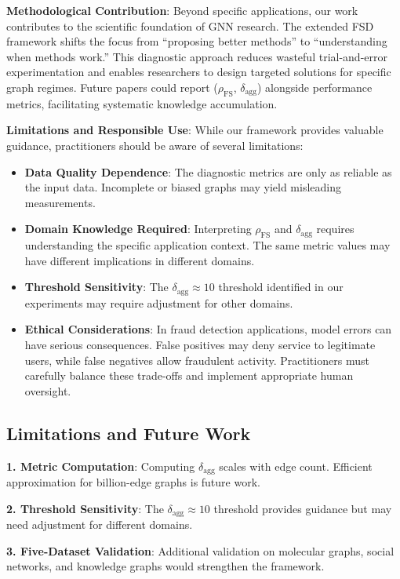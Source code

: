\textbf{Methodological Contribution}: Beyond specific applications, our work contributes to the scientific foundation of GNN research. The extended FSD framework shifts the focus from ``proposing better methods'' to ``understanding when methods work.'' This diagnostic approach reduces wasteful trial-and-error experimentation and enables researchers to design targeted solutions for specific graph regimes. Future papers could report ($\rho_{\text{FS}}$, $\delta_{\text{agg}}$) alongside performance metrics, facilitating systematic knowledge accumulation.

\textbf{Limitations and Responsible Use}: While our framework provides valuable guidance, practitioners should be aware of several limitations:
\begin{itemize}
    \item \textbf{Data Quality Dependence}: The diagnostic metrics are only as reliable as the input data. Incomplete or biased graphs may yield misleading measurements.
    \item \textbf{Domain Knowledge Required}: Interpreting $\rho_{\text{FS}}$ and $\delta_{\text{agg}}$ requires understanding the specific application context. The same metric values may have different implications in different domains.
    \item \textbf{Threshold Sensitivity}: The $\delta_{\text{agg}} \approx 10$ threshold identified in our experiments may require adjustment for other domains.
    \item \textbf{Ethical Considerations}: In fraud detection applications, model errors can have serious consequences. False positives may deny service to legitimate users, while false negatives allow fraudulent activity. Practitioners must carefully balance these trade-offs and implement appropriate human oversight.
\end{itemize}

\subsection{Limitations and Future Work}

\textbf{1. Metric Computation}: Computing $\delta_{\text{agg}}$ scales with edge count. Efficient approximation for billion-edge graphs is future work.

\textbf{2. Threshold Sensitivity}: The $\delta_{\text{agg}} \approx 10$ threshold provides guidance but may need adjustment for different domains.

\textbf{3. Five-Dataset Validation}: Additional validation on molecular graphs, social networks, and knowledge graphs would strengthen the framework.

